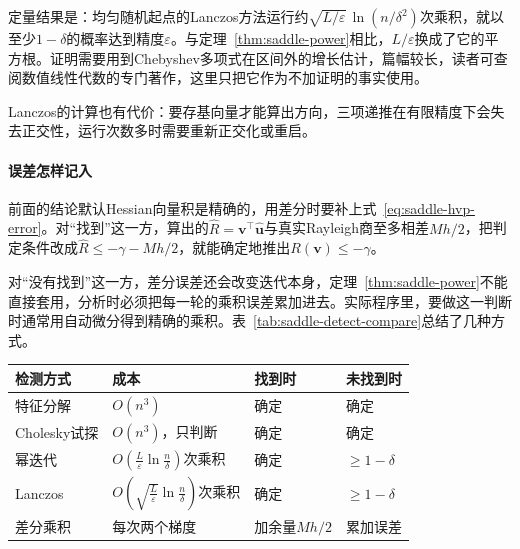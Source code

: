 定量结果是：均匀随机起点的Lanczos方法运行约$\sqrt{L/\varepsilon}\,\ln(n/\delta^2)$次乘积，就以至少$1-\delta$的概率达到精度$\varepsilon$。与定理~\ref{thm:saddle-power}相比，$L/\varepsilon$换成了它的平方根。证明需要用到Chebyshev多项式在区间外的增长估计，篇幅较长，读者可查阅数值线性代数的专门著作，这里只把它作为不加证明的事实使用。

Lanczos的计算也有代价：要存基向量才能算出方向，三项递推在有限精度下会失去正交性，运行次数多时需要重新正交化或重启。

\paragraph{误差怎样记入}
前面的结论默认Hessian向量积是精确的，用差分时要补上式~\eqref{eq:saddle-hvp-error}。对“找到”这一方，算出的$\hat{R}=\bm{v}^\top\hat{\bm{u}}$与真实Rayleigh商至多相差$Mh/2$，把判定条件改成$\hat{R}\leq-\gamma-Mh/2$，就能确定地推出$R(\bm{v})\leq-\gamma$。

对“没有找到”这一方，差分误差还会改变迭代本身，定理~\ref{thm:saddle-power}不能直接套用，分析时必须把每一轮的乘积误差累加进去。实际程序里，要做这一判断时通常用自动微分得到精确的乘积。表~\ref{tab:saddle-detect-compare}总结了几种方式。

\begin{BookInlineTable}
  \centering
  \begin{tabular}{@{}llll@{}}
    \toprule
    检测方式 & 成本 & 找到时 & 未找到时\\
    \midrule
    特征分解 & $O(n^3)$ & 确定 & 确定\\
    Cholesky试探 & $O(n^3)$，只判断 & 确定 & 确定\\
    幂迭代 & $O(\frac{L}{\varepsilon}\ln\frac{n}{\delta})$次乘积 & 确定 & $\geq1-\delta$\\
    Lanczos & $O(\sqrt{\frac{L}{\varepsilon}}\ln\frac{n}{\delta})$次乘积 & 确定 & $\geq1-\delta$\\
    差分乘积 & 每次两个梯度 & 加余量$Mh/2$ & 累加误差\\
    \bottomrule
  \end{tabular}
  \caption{负曲率检测方式的比较，“确定”不计舍入误差，“$\geq1-\delta$”指结论成立的概率。$O(\cdot)$中省略了$L/\varepsilon$的对数因子。}
  \label{tab:saddle-detect-compare}
\end{BookInlineTable}

